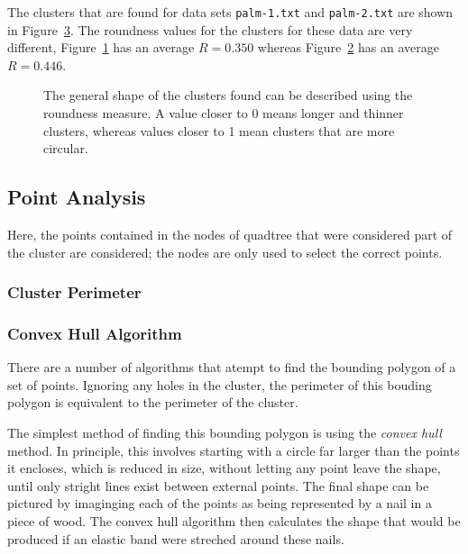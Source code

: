 The clusters that are found for data sets \texttt{palm-1.txt} and
\texttt{palm-2.txt} are shown in Figure~\ref{fig:roundness}. The roundness
values for the clusters for these data are very different,
Figure~\ref{fig:roundness-long.png} has an average $R=0.350$ whereas
Figure~\ref{fig:roundness-round.png} has an average $R=0.446$.

\begin{figure}[tbhp]
	\centering
	\begin{subfigure}[b]{4.2cm}
		\caption{}\label{fig:roundness-long.png}
	\end{subfigure}%
	\quad
	\begin{subfigure}[b]{4.2cm}
		\caption{}\label{fig:roundness-round.png}
	\end{subfigure}

	\caption[A comparison of roundness values.]{The general shape of the
		clusters found can be described using the roundness measure. A value
		closer to 0 means longer and thinner clusters, whereas values closer to
		1 mean clusters that are more circular.}\label{fig:roundness}
\end{figure}

\subsection{Point Analysis}
\label{sub:point_analysis}

Here, the points contained in the nodes of quadtree that were considered part
of the cluster are considered; the nodes are only used to select the correct
points.

\subsubsection{Cluster Perimeter}
\label{ssub:cluster_perimeter_point}

\subsubsection*{Convex Hull Algorithm}
\label{ssub:Convex Hull Algorithm}

There are a number of algorithms that atempt to find the bounding polygon of a
set of points. Ignoring any holes in the cluster, the perimeter of this bouding
polygon is equivalent to the perimeter of the cluster.

The simplest method of finding this bounding polygon is using the \emph{convex
hull} method\cite{barber1996quickhull}. In principle, this involves starting
with a circle far larger than the points it encloses, which is reduced in size,
without letting any point leave the shape, until only stright lines exist
between external points. The final shape can be pictured by imaginging each of
the points as being represented by a nail in a piece of wood. The convex hull
algorithm then calculates the shape that would be produced if an elastic band
were streched around these nails.

